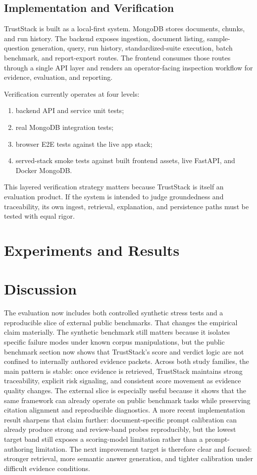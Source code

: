 \documentclass[conference]{IEEEtran}
\newcommand{\TrustSection}[1]{\section{\texorpdfstring{\textcolor{TrustStackBlue}{#1}}{#1}}}
\newcommand{\TrustSubsection}[1]{\subsection{\texorpdfstring{\textcolor{TrustStackTeal}{#1}}{#1}}}
\begin{document}
\TrustSubsection{Implementation and Verification}
TrustStack is built as a local-first system. MongoDB stores documents, chunks, and run history. The backend exposes ingestion, document listing, sample-question generation, query, run history, standardized-suite execution, batch benchmark, and report-export routes. The frontend consumes those routes through a single API layer and renders an operator-facing inspection workflow for evidence, evaluation, and reporting.

Verification currently operates at four levels:
\begin{enumerate}
  \item backend API and service unit tests;
  \item real MongoDB integration tests;
  \item browser E2E tests against the live app stack;
  \item served-stack smoke tests against built frontend assets, live FastAPI, and Docker MongoDB.
\end{enumerate}

This layered verification strategy matters because TrustStack is itself an evaluation product. If the system is intended to judge groundedness and traceability, its own ingest, retrieval, explanation, and persistence paths must be tested with equal rigor.

\TrustSection{Experiments and Results}



\TrustSection{Discussion}
The evaluation now includes both controlled synthetic stress tests and a reproducible slice of external public benchmarks. That changes the empirical claim materially. The synthetic benchmark still matters because it isolates specific failure modes under known corpus manipulations, but the public benchmark section now shows that TrustStack's score and verdict logic are not confined to internally authored evidence packets. Across both study families, the main pattern is stable: once evidence is retrieved, TrustStack maintains strong traceability, explicit risk signaling, and consistent score movement as evidence quality changes. The external slice is especially useful because it shows that the same framework can already operate on public benchmark tasks while preserving citation alignment and reproducible diagnostics. A more recent implementation result sharpens that claim further: document-specific prompt calibration can already produce strong and review-band probes reproducibly, but the lowest target band still exposes a scoring-model limitation rather than a prompt-authoring limitation. The next improvement target is therefore clear and focused: stronger retrieval, more semantic answer generation, and tighter calibration under difficult evidence conditions.
\end{document}
